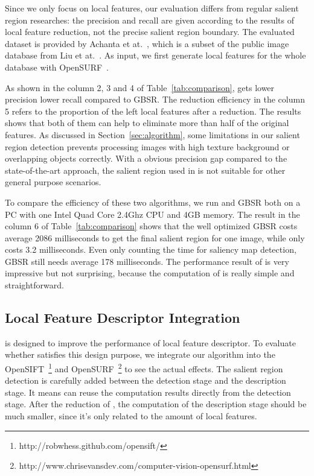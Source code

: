 Since we only focus on local features, our evaluation differs from regular salient region researches: the precision and recall are given according to the results of local feature reduction, not the precise salient region boundary. The evaluated dataset is provided by Achanta et at.~\cite{achanta2009frequency}, which is a subset of the public image database from Liu et at.~\cite{liu2011learning}. As input, we first generate local features for the whole database with OpenSURF~\cite{evans2010opensurf}. 

As shown in the column 2, 3 and 4 of Table~\ref{tab:comparison}, {\sys} gets lower precision lower recall compared to GBSR. The reduction efficiency in the column 5 refers to the proportion of the left local features after a reduction. The results shows that both of them can help to eliminate more than half of the original features. As discussed in Section~\ref{sec:algorithm}, some limitations in our salient region detection prevents processing images with high texture background or overlapping objects correctly. With a obvious precision gap compared to the state-of-the-art approach, the salient region used in {\sys} is not suitable for other general purpose scenarios.

To compare the efficiency of these two algorithms, we run {\sys} and GBSR both on a PC with one Intel Quad Core 2.4Ghz CPU and 4GB memory. The result in the column 6 of Table~\ref{tab:comparison} shows that the well optimized GBSR costs average 2086 milliseconds to get the final salient region for one image, while {\sys} only costs 3.2 milliseconds. Even only counting the time for saliency map detection, GBSR still needs average 178 milliseconds. The performance result of {\sys} is very impressive but not surprising, because the computation of {\sys} is really simple and straightforward.

\subsection{Local Feature Descriptor Integration}
\label{sec:evaluation_integration}

{\sys} is designed to improve the performance of local feature descriptor. To evaluate whether {\sys} satisfies this design purpose, we integrate our algorithm into the OpenSIFT~\footnote{http://robwhess.github.com/opensift/} and OpenSURF~\footnote{http://www.chrisevansdev.com/computer-vision-opensurf.html} to see the actual effects. The salient region detection is carefully added between the detection stage and the description stage. It means {\sys} can reuse the computation results directly from the detection stage. After the reduction of {\sys}, the computation of the description stage should be much smaller, since it's only related to the amount of local features.


